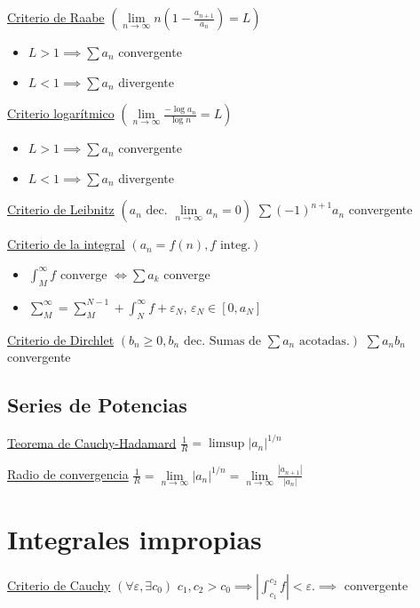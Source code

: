 \documentclass[12pt]{article}
\newcommand{\abs}[1]{\left\vert #1 \right\vert}
\begin{document}
\begin{multicols}{3}
\underline{Criterio de Raabe}
$\left( \lim\limits_{n \to \infty} n \left(1 - \frac{a_{n+1}}{a_n}\right)= L \right)$
\begin{itemize}
	\item $L > 1 \implies \sum a_n$ convergente
	\item $L < 1 \implies \sum a_n$ divergente
\end{itemize}

\underline{Criterio logarítmico}
$\left( \lim\limits_{n \to \infty} \frac{-\log{a_n}}{\log{n}} = L \right)$
\begin{itemize}
	\item $L > 1 \implies \sum a_n$ convergente
	\item $L < 1 \implies \sum a_n$ divergente
\end{itemize}

\underline{Criterio de Leibnitz} $\left( a_n \text{ dec. } \lim\limits_{n \to \infty}
a_n = 0 \right)$
$\sum (-1)^{n+1} a_n$ convergente

\underline{Criterio de la integral} $\left( a_n = f(n), f \text{ integ.} \right)$
\begin{itemize}
	\item $\int_{M}^{\infty} f$ converge $\iff \sum a_k$ converge
	\item $\sum\limits_{M}^{\infty} = \sum\limits_{M}^{N-1} + \int_{N}^{\infty} f
	+ \varepsilon_N$, $\varepsilon_N \in [0,a_N]$
\end{itemize}

\underline{Criterio de Dirchlet} $\left( b_n \geq 0, b_n \text{ dec. Sumas de } \sum a_n
\text{ acotadas.}\right)$
$\sum a_nb_n$ convergente

\subsection{Series de Potencias}

\underline{Teorema de Cauchy-Hadamard}
$\frac{1}{R} = \limsup \abs{a_n}^{1/n}$

\underline{Radio de convergencia}
$\frac{1}{R} = \lim\limits_{n \to \infty} \abs{a_n}^{1/n} = 
\lim\limits_{n \to \infty} \frac{\abs{a_{n+1}}}{\abs{a_n}}$

\section{Integrales impropias}

\underline{Criterio de Cauchy} $\left( \forall \varepsilon, \exists c_0 \right)$
$c_1, c_2 > c_0 \implies \abs{\int_{c_1}^{c_2} f} < \varepsilon. \implies$ convergente



\end{multicols}
\end{document}
